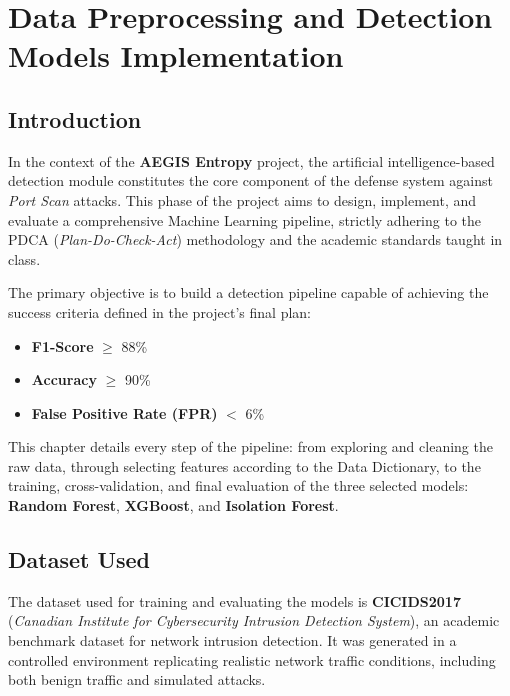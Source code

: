 \documentclass[12pt,a4paper]{article}
\begin{document}

\section{Data Preprocessing and Detection Models Implementation}

\subsection{Introduction}

In the context of the \textbf{AEGIS Entropy} project, the artificial intelligence-based detection module constitutes the core component of the defense system against \textit{Port Scan} attacks. This phase of the project aims to design, implement, and evaluate a comprehensive Machine Learning pipeline, strictly adhering to the PDCA (\textit{Plan-Do-Check-Act}) methodology and the academic standards taught in class.

The primary objective is to build a detection pipeline capable of achieving the success criteria defined in the project's final plan:
\begin{itemize}
    \item \textbf{F1-Score} $\geq$ 88\%
    \item \textbf{Accuracy} $\geq$ 90\%
    \item \textbf{False Positive Rate (FPR)} $<$ 6\%
\end{itemize}

This chapter details every step of the pipeline: from exploring and cleaning the raw data, through selecting features according to the Data Dictionary, to the training, cross-validation, and final evaluation of the three selected models: \textbf{Random Forest}, \textbf{XGBoost}, and \textbf{Isolation Forest}.

\subsection{Dataset Used}

The dataset used for training and evaluating the models is \textbf{CICIDS2017} (\textit{Canadian Institute for Cybersecurity Intrusion Detection System}), an academic benchmark dataset for network intrusion detection. It was generated in a controlled environment replicating realistic network traffic conditions, including both benign traffic and simulated attacks.
\end{document}
